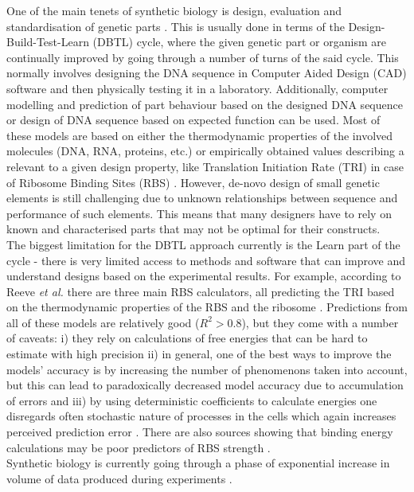 \documentclass{article}
\begin{document}
One of the main tenets of synthetic biology is design, evaluation and standardisation of genetic parts \cite{Brophy2014,Canton2008,Stanton2014}.
This is usually done in terms of the Design-Build-Test-Learn (DBTL) cycle, where the given genetic part or organism are continually improved by going through a number of turns of the said cycle.
This normally involves designing the DNA sequence in Computer Aided Design (CAD) software and then physically testing it in a laboratory. 
Additionally, computer modelling and prediction of part behaviour based on the designed DNA sequence or design of DNA sequence based on expected function can be used\cite{Yeoh2019,Nielsen2016}.
Most of these models are based on either the thermodynamic properties of the involved molecules (DNA, RNA, proteins, etc.) or empirically obtained values describing a relevant to a given design property, like Translation Initiation Rate (TRI) in case of Ribosome Binding Sites (RBS) \cite{Xia1998,Chen2013,Reeve2014}.
However, de-novo design of small genetic elements is still challenging due to unknown relationships between sequence and performance of such elements. 
This means that many designers have to rely on known and characterised parts that may not be optimal for their constructs.\\
The biggest limitation for the DBTL approach currently is the Learn part of the cycle - there is very limited access to methods and software that can improve and understand designs based on the experimental results.
For example, according to Reeve \emph{et al.} there are three main RBS calculators, all predicting the TRI based on the thermodynamic properties of the RBS and the ribosome \cite{Seo2013,Na2010,Salis2009}. 
Predictions from all of these models are relatively good ($R^2 >0.8$), but they come with a number of caveats: i) they rely on calculations of free energies that can be hard to estimate with high precision ii) in general, one of the best ways to improve the models' accuracy is by increasing the number of phenomenons taken into account, but this can lead to paradoxically decreased model accuracy due to accumulation of errors \cite{EspahBorujeni2016} and iii) by using deterministic coefficients to calculate energies one disregards often stochastic nature of processes in the cells which again increases perceived prediction error \cite{Goss1998}. 
There are also sources showing that binding energy calculations may be poor predictors of RBS strength \cite{Saito2020,Sherer1980}.\\
Synthetic biology is currently going through a phase of exponential increase in volume of data produced during experiments \cite{Freemont2019}. 
\end{document}
